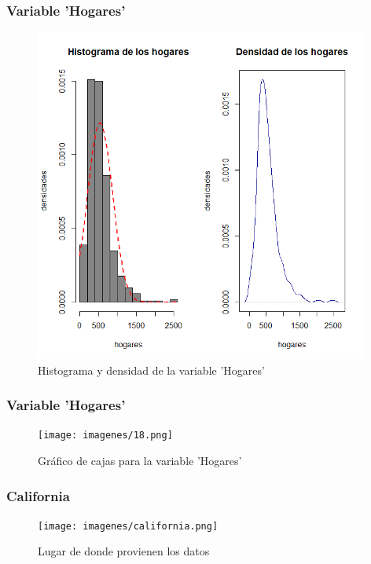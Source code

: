 \documentclass[12pt]{beamer}
\begin{document}
\begin{frame}
\frametitle{Variable 'Hogares'}
\begin{figure}[!h]
    \begin{center}
        \includegraphics[width=11cm]{imagenes/7.png}
        \caption{Histograma y densidad de la variable 'Hogares'}
        \label{fig:Densidad}
    \end{center}
\end{figure}
\end{frame}
\begin{frame}
\frametitle{Variable 'Hogares'}
\begin{figure}[!h]
    \begin{center}
        \texttt{[image: imagenes/18.png]}
        \caption{Gráfico de cajas para la variable 'Hogares'}
        \label{fig:Densidad}
    \end{center}
\end{figure}
\end{frame}

\begin{frame}
\frametitle{California}
\begin{figure}[!h]
    \begin{center}
        \texttt{[image: imagenes/california.png]}
        \caption{Lugar de donde provienen los datos}
        \label{fig:Densidad}
    \end{center}
\end{figure}
\end{frame}
\end{document}

